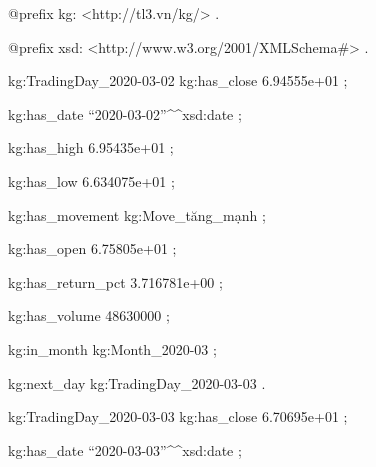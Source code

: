 @prefix kg: <http://tl3.vn/kg/> .\par
@prefix xsd: <http://www.w3.org/2001/XMLSchema\#> .\par
\par
kg:TradingDay\_2020-03-02 kg:has\_close 6.94555e+01 ;\par
    kg:has\_date ``2020-03-02''\^{}\^{}xsd:date ;\par
    kg:has\_high 6.95435e+01 ;\par
    kg:has\_low 6.634075e+01 ;\par
    kg:has\_movement kg:Move\_tăng\_mạnh ;\par
    kg:has\_open 6.75805e+01 ;\par
    kg:has\_return\_pct 3.716781e+00 ;\par
    kg:has\_volume 48630000 ;\par
    kg:in\_month kg:Month\_2020-03 ;\par
    kg:next\_day kg:TradingDay\_2020-03-03 .\par
\par
kg:TradingDay\_2020-03-03 kg:has\_close 6.70695e+01 ;\par
    kg:has\_date ``2020-03-03''\^{}\^{}xsd:date ;\par
